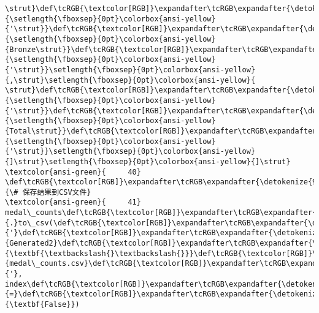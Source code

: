\documentclass[11pt]{article}
\begin{document}
\begin{Verbatim}[commandchars=\\\{\}, frame=single, framerule=2mm, rulecolor=\color{outerrorbackground}]
\strut}\def\tcRGB{\textcolor[RGB]}\expandafter\tcRGB\expandafter{\detokenize{175,0,0}}{\setlength{\fboxsep}{0pt}\colorbox{ansi-yellow}{'\strut}}\def\tcRGB{\textcolor[RGB]}\expandafter\tcRGB\expandafter{\detokenize{175,0,0}}{\setlength{\fboxsep}{0pt}\colorbox{ansi-yellow}{Bronze\strut}}\def\tcRGB{\textcolor[RGB]}\expandafter\tcRGB\expandafter{\detokenize{175,0,0}}{\setlength{\fboxsep}{0pt}\colorbox{ansi-yellow}{'\strut}}\setlength{\fboxsep}{0pt}\colorbox{ansi-yellow}{,\strut}\setlength{\fboxsep}{0pt}\colorbox{ansi-yellow}{ \strut}\def\tcRGB{\textcolor[RGB]}\expandafter\tcRGB\expandafter{\detokenize{175,0,0}}{\setlength{\fboxsep}{0pt}\colorbox{ansi-yellow}{'\strut}}\def\tcRGB{\textcolor[RGB]}\expandafter\tcRGB\expandafter{\detokenize{175,0,0}}{\setlength{\fboxsep}{0pt}\colorbox{ansi-yellow}{Total\strut}}\def\tcRGB{\textcolor[RGB]}\expandafter\tcRGB\expandafter{\detokenize{175,0,0}}{\setlength{\fboxsep}{0pt}\colorbox{ansi-yellow}{'\strut}}\setlength{\fboxsep}{0pt}\colorbox{ansi-yellow}{]\strut}\setlength{\fboxsep}{0pt}\colorbox{ansi-yellow}{]\strut}
\textcolor{ansi-green}{     40} \def\tcRGB{\textcolor[RGB]}\expandafter\tcRGB\expandafter{\detokenize{95,135,135}}{\# 保存结果到CSV文件}
\textcolor{ansi-green}{     41} medal\_counts\def\tcRGB{\textcolor[RGB]}\expandafter\tcRGB\expandafter{\detokenize{98,98,98}}{.}to\_csv(\def\tcRGB{\textcolor[RGB]}\expandafter\tcRGB\expandafter{\detokenize{175,0,0}}{'}\def\tcRGB{\textcolor[RGB]}\expandafter\tcRGB\expandafter{\detokenize{175,0,0}}{Generated2}\def\tcRGB{\textcolor[RGB]}\expandafter\tcRGB\expandafter{\detokenize{175,95,0}}{\textbf{\textbackslash{}\textbackslash{}}}\def\tcRGB{\textcolor[RGB]}\expandafter\tcRGB\expandafter{\detokenize{175,0,0}}{medal\_counts.csv}\def\tcRGB{\textcolor[RGB]}\expandafter\tcRGB\expandafter{\detokenize{175,0,0}}{'}, index\def\tcRGB{\textcolor[RGB]}\expandafter\tcRGB\expandafter{\detokenize{98,98,98}}{=}\def\tcRGB{\textcolor[RGB]}\expandafter\tcRGB\expandafter{\detokenize{0,135,0}}{\textbf{False}})


\end{Verbatim}
\end{document}
